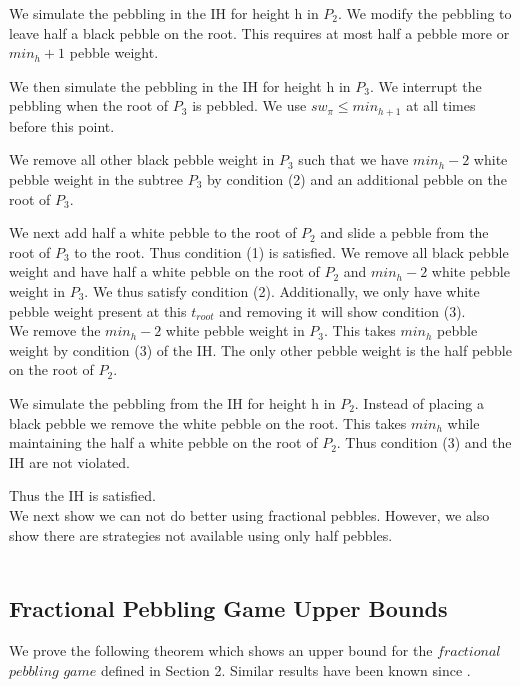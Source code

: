 \documentclass[12pt]{article}
\newcommand{\troot}{t_{root}}
\begin{document}
We simulate the pebbling in the IH for height h in $P_2$. We modify the pebbling to leave half a black pebble on the root. This requires at most half a pebble more or $min_h+1$ pebble weight.

We then simulate the pebbling in the IH for height h in $P_3$. We interrupt the pebbling when the root of $P_3$ is pebbled. We use $sw_\pi \leq min_{h+1}$ at all times before this point.

We remove all other black pebble weight in $P_3$ such that we have $min_h - 2$ white pebble weight in the subtree $P_3$ by condition (2) and an additional pebble on the root of $P_3$.

We next add half a white pebble to the root of $P_2$ and slide a pebble from the root of $P_3$ to the root. Thus condition (1) is satisfied. We remove all black pebble weight and have half a white pebble on the root of $P_2$ and $min_h-2$ white pebble weight in $P_3$. We thus satisfy condition (2). Additionally, we only have white pebble weight present at this $\troot$ and removing it will show condition (3).\\



We remove the $min_h - 2$ white pebble weight in $P_3$. This takes $min_h$ pebble weight by condition (3) of the IH. The only other pebble weight is the half pebble on the root of $P_2$.

We simulate the pebbling from the IH for height h in $P_2$. Instead of placing a black pebble we remove the white pebble on the root. This takes $min_h$ while maintaining the half a white pebble on the root of $P_2$. Thus condition (3) and the IH are not violated.

Thus the IH is satisfied.\\

We next show we can not do better using fractional pebbles. However, we also show there are strategies not available using only half pebbles.\\\\





\subsection{Fractional Pebbling Game Upper Bounds} 



We prove the following theorem which shows an upper bound for the $fractional $ $pebbling$ $game$ defined in Section 2. Similar results have been known since \cite{c:pebjournal}.
\end{document}
